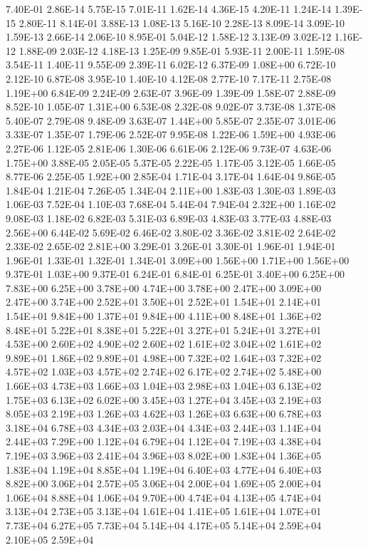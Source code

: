 7.40E-01    2.86E-14    5.75E-15    7.01E-11    1.62E-14    4.36E-15    4.20E-11    1.24E-14    1.39E-15    2.80E-11
8.14E-01    3.88E-13    1.08E-13    5.16E-10    2.28E-13    8.09E-14    3.09E-10    1.59E-13    2.66E-14    2.06E-10
8.95E-01    5.04E-12    1.58E-12    3.13E-09    3.02E-12    1.16E-12    1.88E-09    2.03E-12    4.18E-13    1.25E-09
9.85E-01    5.93E-11    2.00E-11    1.59E-08    3.54E-11    1.40E-11    9.55E-09    2.39E-11    6.02E-12    6.37E-09
1.08E+00    6.72E-10    2.12E-10    6.87E-08    3.95E-10    1.40E-10    4.12E-08    2.77E-10    7.17E-11    2.75E-08
1.19E+00    6.84E-09    2.24E-09    2.63E-07    3.96E-09    1.39E-09    1.58E-07    2.88E-09    8.52E-10    1.05E-07
1.31E+00    6.53E-08    2.32E-08    9.02E-07    3.73E-08    1.37E-08    5.40E-07    2.79E-08    9.48E-09    3.63E-07
1.44E+00    5.85E-07    2.35E-07    3.01E-06    3.33E-07    1.35E-07    1.79E-06    2.52E-07    9.95E-08    1.22E-06
1.59E+00    4.93E-06    2.27E-06    1.12E-05    2.81E-06    1.30E-06    6.61E-06    2.12E-06    9.73E-07    4.63E-06
1.75E+00    3.88E-05    2.05E-05    5.37E-05    2.22E-05    1.17E-05    3.12E-05    1.66E-05    8.77E-06    2.25E-05
1.92E+00    2.85E-04    1.71E-04    3.17E-04    1.64E-04    9.86E-05    1.84E-04    1.21E-04    7.26E-05    1.34E-04
2.11E+00    1.83E-03    1.30E-03    1.89E-03    1.06E-03    7.52E-04    1.10E-03    7.68E-04    5.44E-04    7.94E-04
2.32E+00    1.16E-02    9.08E-03    1.18E-02    6.82E-03    5.31E-03    6.89E-03    4.83E-03    3.77E-03    4.88E-03
2.56E+00    6.44E-02    5.69E-02    6.46E-02    3.80E-02    3.36E-02    3.81E-02    2.64E-02    2.33E-02    2.65E-02
2.81E+00    3.29E-01    3.26E-01    3.30E-01    1.96E-01    1.94E-01    1.96E-01    1.33E-01    1.32E-01    1.34E-01
3.09E+00    1.56E+00    1.71E+00    1.56E+00    9.37E-01    1.03E+00    9.37E-01    6.24E-01    6.84E-01    6.25E-01
3.40E+00    6.25E+00    7.83E+00    6.25E+00    3.78E+00    4.74E+00    3.78E+00    2.47E+00    3.09E+00    2.47E+00
3.74E+00    2.52E+01    3.50E+01    2.52E+01    1.54E+01    2.14E+01    1.54E+01    9.84E+00    1.37E+01    9.84E+00
4.11E+00    8.48E+01    1.36E+02    8.48E+01    5.22E+01    8.38E+01    5.22E+01    3.27E+01    5.24E+01    3.27E+01
4.53E+00    2.60E+02    4.90E+02    2.60E+02    1.61E+02    3.04E+02    1.61E+02    9.89E+01    1.86E+02    9.89E+01
4.98E+00    7.32E+02    1.64E+03    7.32E+02    4.57E+02    1.03E+03    4.57E+02    2.74E+02    6.17E+02    2.74E+02
5.48E+00    1.66E+03    4.73E+03    1.66E+03    1.04E+03    2.98E+03    1.04E+03    6.13E+02    1.75E+03    6.13E+02
6.02E+00    3.45E+03    1.27E+04    3.45E+03    2.19E+03    8.05E+03    2.19E+03    1.26E+03    4.62E+03    1.26E+03
6.63E+00    6.78E+03    3.18E+04    6.78E+03    4.34E+03    2.03E+04    4.34E+03    2.44E+03    1.14E+04    2.44E+03
7.29E+00    1.12E+04    6.79E+04    1.12E+04    7.19E+03    4.38E+04    7.19E+03    3.96E+03    2.41E+04    3.96E+03
8.02E+00    1.83E+04    1.36E+05    1.83E+04    1.19E+04    8.85E+04    1.19E+04    6.40E+03    4.77E+04    6.40E+03
8.82E+00    3.06E+04    2.57E+05    3.06E+04    2.00E+04    1.69E+05    2.00E+04    1.06E+04    8.88E+04    1.06E+04
9.70E+00    4.74E+04    4.13E+05    4.74E+04    3.13E+04    2.73E+05    3.13E+04    1.61E+04    1.41E+05    1.61E+04
1.07E+01    7.73E+04    6.27E+05    7.73E+04    5.14E+04    4.17E+05    5.14E+04    2.59E+04    2.10E+05    2.59E+04
